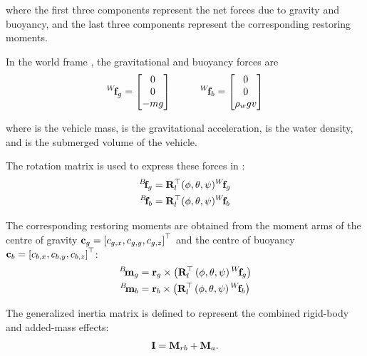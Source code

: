 where the first three components represent the net forces due to gravity and buoyancy, and the last
three components represent the corresponding restoring moments.

In the world frame , the gravitational and buoyancy forces are
\begin{align}
	\fldvect{f}{W}{g} =
	\begin{bmatrix}
		0 \\ 0 \\ -\scal{m}\scal{g}
	\end{bmatrix} \hspace{1cm}
	\fldvect{f}{W}{b} =
	\begin{bmatrix}
		0 \\ 0 \\ \ldscal{\rho}{w}\scal{g}\scal{v}
	\end{bmatrix}
\end{align}

where  is the vehicle mass,  is the gravitational acceleration,  is
the water density, and  is the submerged volume of the vehicle.

The rotation matrix  is used to express these forces in :
\begin{align}
	\fldvect{f}{B}{g} & = \lrdmatr{R}{l}^{\top}(\phi,\theta,\psi) \fldvect{f}{W}{g} \\
	\fldvect{f}{B}{b} & = \lrdmatr{R}{l}^{\top}(\phi,\theta,\psi) \fldvect{f}{W}{b}
\end{align}

The corresponding restoring moments are obtained from the moment arms of the centre of gravity
$\ldvect{c}{g}=\left[\ldscal{c}{g,x}, \ldscal{c}{g,y}, \ldscal{c}{g,z}\right]^{\top}$ and the
centre of buoyancy $\ldvect{c}{b}=\left[\ldscal{c}{b,x}, \ldscal{c}{b,y},
		\ldscal{c}{b,z}\right]^{\top}$:
\begin{align}
	\fldvect{m}{B}{g} & = \ldvect{r}{g} \times \left( \lrmatr{R}{\top}{l}\left(\phi,\theta,\psi\right)\fldvect{f}{W}{g} \right) \\
	\fldvect{m}{B}{b} & = \ldvect{r}{b} \times \left( \lrmatr{R}{\top}{l}\left(\phi,\theta,\psi\right)\fldvect{f}{W}{b} \right)
\end{align}

The generalized inertia matrix  is defined to represent the combined rigid-body and
added-mass effects:
\begin{align}
	\matr{I} = \lrdmatr{M}{rb} + \lrdmatr{M}{a}.
\end{align}

